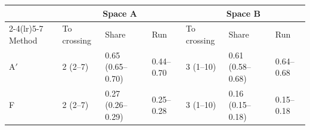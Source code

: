 \begin{tabular}{lllllll}\toprule
 & \multicolumn{3}{c}{Space A} & \multicolumn{3}{c}{Space B}\\\cmidrule(lr){2-4}\cmidrule(lr){5-7}
Method & To crossing & Share & Run & To crossing & Share & Run\\\midrule
A$'$ & 2 (2--7) & 0.65 (0.65--0.70) & 0.44--0.70 & 3 (1--10) & 0.61 (0.58--0.68) & 0.64--0.68\\
F & 2 (2--7) & 0.27 (0.26--0.29) & 0.25--0.28 & 3 (1--10) & 0.16 (0.15--0.18) & 0.15--0.18\\
\bottomrule\end{tabular}
